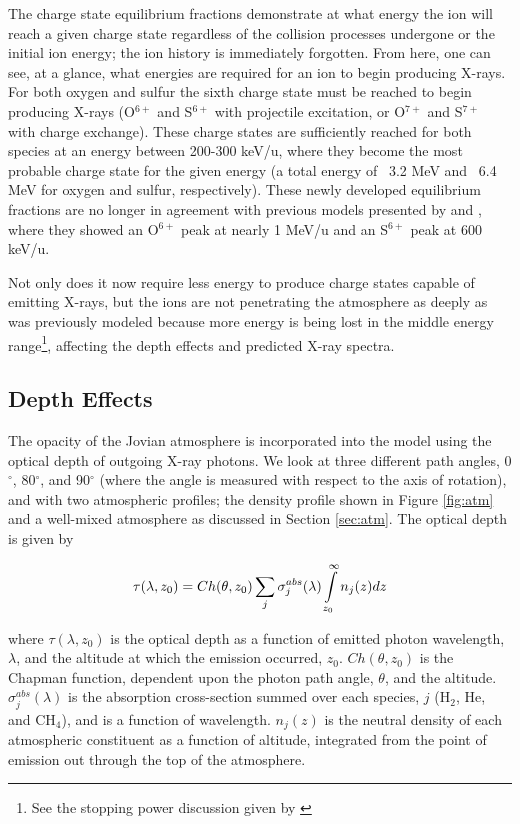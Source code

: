 \documentclass[draft]{agujournal2018}
\begin{document}
The charge state equilibrium fractions demonstrate at what energy the ion will reach a given charge state regardless of the collision processes undergone or the initial ion energy; the ion history is immediately forgotten.
From here, one can see, at a glance, what energies are required for an ion to begin producing X-rays.
For both oxygen and sulfur the sixth charge state must be reached to begin producing X-rays (O$^{6+}$ and S$^{6+}$ with projectile excitation, or O$^{7+}$ and S$^{7+}$ with charge exchange).
These charge states are sufficiently reached for both species at an energy between 200-300 keV/u, where they become the most probable charge state for the given energy (a total energy of ~3.2 MeV and ~6.4 MeV for oxygen and sulfur, respectively).
These newly developed equilibrium fractions are no longer in agreement with previous models presented by \citet{ozak2010} and \citet{houston2018}, where they showed an O$^{6+}$ peak at nearly 1 MeV/u and an S$^{6+}$ peak at 600 keV/u.

Not only does it now require less energy to produce charge states capable of emitting X-rays, but the ions are not penetrating the atmosphere as deeply as was previously modeled because more energy is being lost in the middle energy range\footnote{See the stopping power discussion given by \citet{schultz2018}}, affecting the depth effects and predicted X-ray spectra.

\subsection{Depth Effects}

The opacity of the Jovian atmosphere is incorporated into the model using the optical depth of outgoing X-ray photons.
We look at three different path angles, 0$^{\circ}$, 80$^{\circ}$, and 90$^{\circ}$ (where the angle is measured with respect to the axis of rotation), and with two atmospheric profiles; the density profile shown in Figure \ref{fig:atm} and a well-mixed atmosphere as discussed in Section \ref{sec:atm}.
The optical depth is given by

\begin{equation}
    \tau(\lambda,z_{0})=Ch(\theta,z_{0})\sum_{j}\sigma_{j}^{abs}(\lambda)\int\displaylimits_{z_{0}}^{\infty}n_{j}(z)dz
    \label{eqn:tau}
\end{equation}

\noindent where $\tau(\lambda,z_{0})$ is the optical depth as a function of emitted photon wavelength, $\lambda$, and the altitude at which the emission occurred, $z_{0}$.
$Ch(\theta,z_{0})$ is the Chapman function, dependent upon the photon path angle, $\theta$, and the altitude.
$\sigma_j^{abs}(\lambda)$ is the absorption cross-section summed over each species, $j$ (H$_2$, He, and CH$_4$), and is a function of wavelength.
$n_j(z)$ is the neutral density of each atmospheric constituent as a function of altitude, integrated from the point of emission out through the top of the atmosphere.
\end{document}
